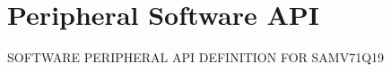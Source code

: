 \hypertarget{group__SAMV71Q19__api}{}\section{Peripheral Software A\+PI}
\label{group__SAMV71Q19__api}
S\+O\+F\+T\+W\+A\+RE P\+E\+R\+I\+P\+H\+E\+R\+AL A\+PI D\+E\+F\+I\+N\+I\+T\+I\+ON F\+OR S\+A\+M\+V71\+Q19 